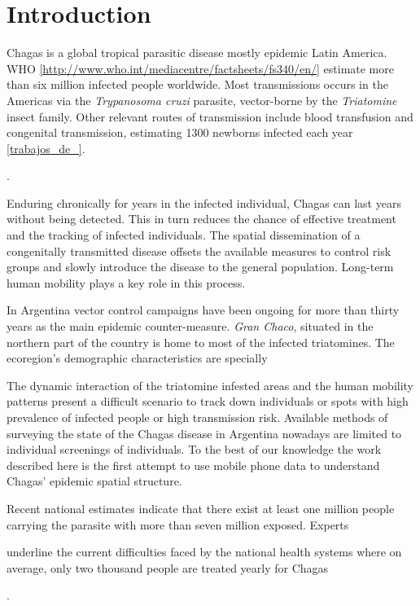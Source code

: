 \section{Introduction}

Chagas is a global tropical parasitic disease mostly epidemic Latin America. WHO \ref{http://www.who.int/mediacentre/factsheets/fs340/en/} estimate more than six million infected people worldwide. Most transmissions occurs in the Americas via the \textit{Trypanosoma cruzi} parasite, vector-borne by the \textit{Triatomine} insect family. Other relevant routes of transmission include blood transfusion and congenital transmission, estimating 1300 newborns infected each year \ref{trabajos_de_}.\begin{comment}  en el drive estan las ppt del min salud \end{comment}. 

Enduring chronically for years in the infected individual, Chagas can last years without being detected. This in turn reduces the chance of effective treatment and the tracking of infected individuals. The spatial dissemination of a congenitally transmitted disease offsets the available measures to control risk groups and slowly introduce the disease to the general population. Long-term human mobility plays a key role in this process.

In Argentina vector control campaigns have been ongoing for more than thirty years as the main epidemic counter-measure. \textit{Gran Chaco}, situated in the northern part of the country is home to most of the infected triatomines. The ecoregion's demographic characteristics are specially 

The dynamic interaction of the triatomine infested areas and the human mobility patterns present a difficult scenario to track down individuals or spots with high prevalence of infected people or high transmission risk. Available methods of surveying the state of the Chagas disease in Argentina nowadays are limited to individual screenings of individuals. To the best of our knowledge the work described here is the first attempt to use mobile phone data to understand Chagas' epidemic spatial structure. \begin{comment}  Existe una forma de decir esto de manera correcta.. o asi les parece bien? \end{comment}

Recent national estimates indicate that there exist at least one million people carrying the parasite with more than seven million exposed. Experts \begin{comment}  aca como referencio a Diego Weinberg y Mundo Sano? \end{comment} underline the current difficulties faced by the national health systems where on average, only two thousand people are treated yearly for Chagas  \begin{comment}  aca nuevamente esta referencia es de MS \end{comment}. 

